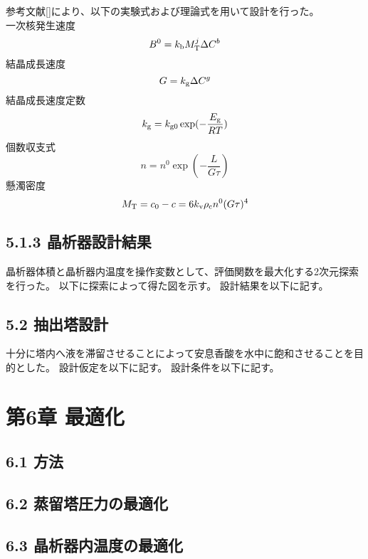 \documentclass[a4j]{jsarticle}
\begin{document}
参考文献[]により、以下の実験式および理論式を用いて設計を行った。\\
一次核発生速度
\begin{equation}
    B^0 = k_{{\rm b}}M_{{\rm T}}^j \Delta C^b
\end{equation}
結晶成長速度
\begin{equation}
    G = k_{{\rm g}}\Delta C^g
\end{equation}
結晶成長速度定数
\begin{equation}
    k_{{\rm g}} = k_{{\rm g0}} \exp(-\frac{E_{{\rm g}}}{RT})
\end{equation}
個数収支式
\begin{equation}
    n=n^0 \exp(-\frac{L}{G\tau})
\end{equation}
懸濁密度
\begin{equation}
    M_{{\rm T}} = c_0-c = 6k_{{\rm v}}\rho_{{\rm c}}n^0(G\tau)^4
\end{equation}

\subsection*{5.1.3 晶析器設計結果}
晶析器体積と晶析器内温度を操作変数として、評価関数を最大化する2次元探索を行った。
以下に探索によって得た図を示す。
設計結果を以下に記す。

\subsection*{5.2 抽出塔設計}
十分に塔内へ液を滞留させることによって安息香酸を水中に飽和させることを目的とした。
設計仮定を以下に記す。
設計条件を以下に記す。

\newpage
\section*{第6章 最適化}
\subsection*{6.1 方法}

\subsection*{6.2 蒸留塔圧力の最適化}

\subsection*{6.3 晶析器内温度の最適化}
\end{document}
